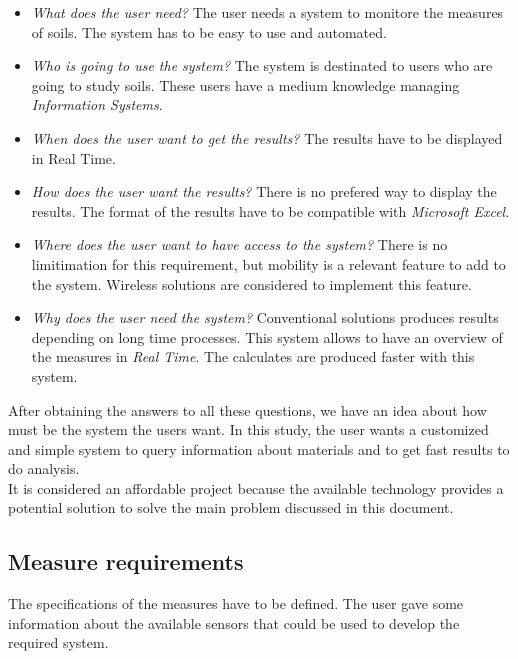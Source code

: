 \begin{itemize}

\item \textit{What does the user need?} The user needs a system to monitore the measures of soils. The system has to be easy to use and automated.

\item \textit{Who is going to use the system?} The system is destinated to users who are going to study soils. These users have a medium knowledge managing \textit{Information Systems}.

\item \textit{When does the user want to get the results?} The results have to be displayed in Real Time.

\item \textit{How does the user want the results?} There is no prefered way to display the results. The format of the results have to be compatible with \textit{Microsoft Excel}.

\item \textit{Where does the user want to have access to the system?} There is no limitimation for this requirement, but mobility is a relevant feature to add to the system. Wireless solutions are considered to implement this feature.

\item \textit{Why does the user need the system?} Conventional solutions produces results depending on long time processes. This system allows to have an overview of the measures in \textit{Real Time}. The calculates are produced faster with this system.

\end{itemize}

After obtaining the answers to all these questions, we have an idea about how must be the system the users want. In this study, the user wants a customized and simple system to query information about materials and to get fast results to do analysis.\\

It is considered an affordable project because the available technology provides a potential solution to solve the main problem discussed in this document.

\subsection{Measure requirements}

The specifications of the measures have to be defined. The user gave some information about the available sensors that could be used to develop the required system.\\

